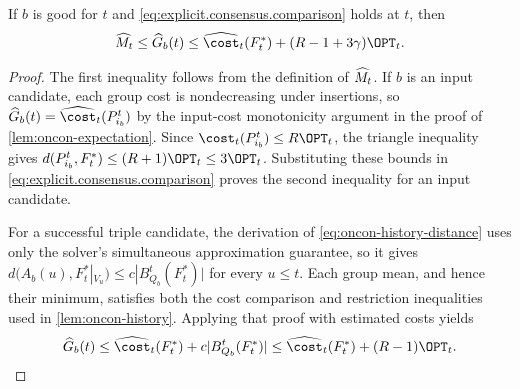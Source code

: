 \begin{lemma}\label{lem:explicit.estimated.history}
If $ b $ is good for $ t $ and \eqref{eq:explicit.consensus.comparison} holds at $ t $, then
\begin{align}
    \edminimum{t}\le\edhistory{b}{t}
    \le\edcost{t}(F_t^*)+(R-1+3\gamma)\OPT_t.
    \label{eq:explicit.consensus.good.history}
\end{align}
\end{lemma}
\begin{proof}
The first inequality follows from the definition of $ \widehat M_{t} $.
If $ b $ is an input candidate, each group cost is nondecreasing under insertions, so $ \edhistory{b}{t}=\edcost{t}(P_{i_b}^t) $ by the input-cost monotonicity argument in the proof of \cref{lem:oncon-expectation}.
Since $ \cost_t(P_{i_b}^t)\le R\OPT_t $, the triangle inequality gives $ d(P_{i_b}^t,F_t^*)\le(R+1)\OPT_t\le3\OPT_t $.
Substituting these bounds in \eqref{eq:explicit.consensus.comparison} proves the second inequality for an input candidate.

For a successful triple candidate, the derivation of \eqref{eq:oncon-history-distance} uses only the solver's simultaneous approximation guarantee, so it gives $ d(A_b(u),F_t^*|_{V_u})\le c|B_{Q_b}^t(F_t^*)| $ for every $ u\le t $.
Each group mean, and hence their minimum, satisfies both the cost comparison and restriction inequalities used in \cref{lem:oncon-history}.
Applying that proof with estimated costs yields
\begin{align}
    \edhistory{b}{t}
    \le\edcost{t}(F_t^*)+c|B_{Q_b}^t(F_t^*)|
    \le\edcost{t}(F_t^*)+(R-1)\OPT_t.
    \nonumber
\end{align}
\end{proof}


